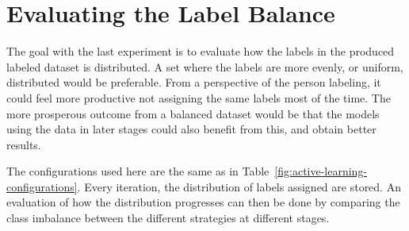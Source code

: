 \section{Evaluating the Label Balance}
The goal with the last experiment is to evaluate how the labels in the produced labeled dataset is distributed.
A set where the labels are more evenly, or uniform, distributed would be preferable.
From a perspective of the person labeling, it could feel more productive not assigning the same labels most of the time.
The more prosperous outcome from a balanced dataset would be that the models using the data in later stages could also benefit from this, and obtain better results.

The configurations used here are the same as in Table~\ref{fig:active-learning-configurations}.
Every iteration, the distribution of labels assigned are stored.
An evaluation of how the distribution progresses can then be done by comparing the class imbalance between the different strategies at different stages.
